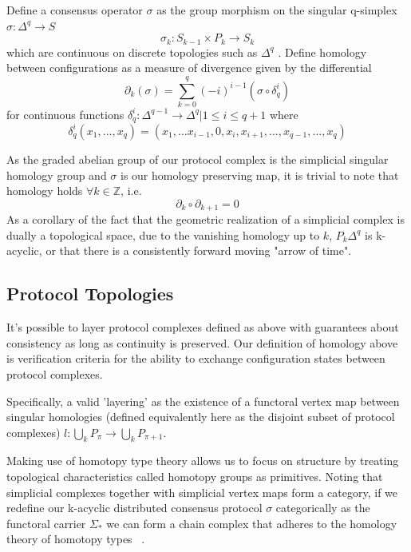 \documentclass[runningheads]{llncs}
\begin{document}
Define a consensus operator $\sigma$ as the group morphism on the singular q-simplex $\sigma: \Delta^q \rightarrow S$ 
\begin{equation} \label{eq1}
\sigma_k: S_{k-1} \times P_k \rightarrow S_{k}
\end{equation} \label{eq1}
which are continuous on discrete topologies such as $\Delta^q$ \cite{ref_article1}. Define homology between configurations as a measure of divergence given by the differential 
\begin{equation} 
\partial_k(\sigma) = \sum^{q}_{k=0} (-i)^{i-1}(\sigma \circ \delta_q^{i} )
\end{equation}
for continuous functions $\delta^{i}_q: \Delta^{q-1} \rightarrow \Delta^q | 1 \leq i \leq q+1$ where 
\begin{equation}
\delta^{i}_q(x_1, \dots, x_q) = (x_1, \dots x_{i-1}, 0, x_i, x_{i+1}, \dots, x_{q-1}, \dots, x_q)
\end{equation}

As the graded abelian group of our protocol complex is the simplicial singular homology group and $\sigma$ is our homology preserving map, it is trivial to note that homology holds $\forall k \in \mathbb{Z}$, i.e.
\begin{equation} \label{eq1}
\partial_k \circ \partial_{k+1} = 0
\end{equation} \label{eq1}
As a corollary of the fact that the geometric realization of a simplicial complex is dually a topological space, due to the vanishing homology up to $k$, $P_k\Delta^q$ is k-acyclic, or that there is a consistently forward moving "arrow of time".

\subsection{Protocol Topologies}
It's possible to layer protocol complexes defined as above with guarantees about consistency as long as continuity is preserved. Our definition of homology above is verification criteria for the ability to exchange configuration states between protocol complexes.

Specifically, a valid 'layering' as the existence of a functoral vertex map between singular homologies (defined equivalently here as the disjoint subset of protocol complexes) $l: \bigcup_{k} P_{\pi} \rightarrow \bigcup_{k} P_{\pi+1}$.

Making use of homotopy type theory allows us to focus on structure by treating topological characteristics called homotopy groups as primitives. Noting that simplicial complexes together with simplicial vertex maps form a category, if we redefine our k-acyclic distributed consensus protocol $\sigma$ categorically as the functoral carrier $\Sigma_{*}$  we can form a chain complex that adheres to the homology theory of homotopy types ~\cite{ref_article5}.
\end{document}
